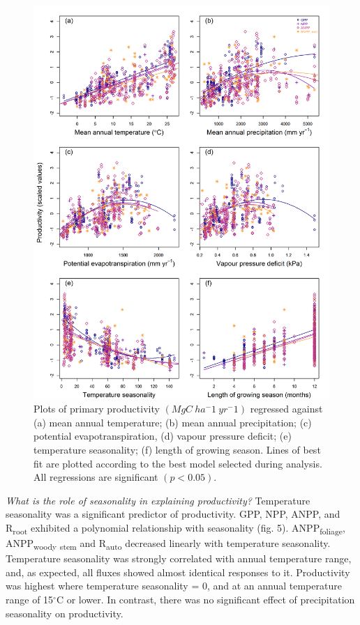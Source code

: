 \documentclass[]{article}
\begin{document}
\begin{figure}[H]
\includegraphics[width=1\linewidth]{combined_plots} \caption{Plots of primary productivity $(MgC~ha^-1~yr^-1)$ regressed against (a) mean annual temperature; (b) mean annual precipitation; (c) potential evapotranspiration, (d) vapour pressure deficit; (e) temperature seasonality; (f) length of growing season. Lines of best fit are plotted according to the best model selected during analysis. All regressions are significant $(p<0.05)$.}\label{fig:unnamed-chunk-9}
\end{figure}

\emph{What is the role of seasonality in explaining productivity?}
Temperature seasonality was a significant predictor of productivity.
GPP, NPP, ANPP, and R\textsubscript{root} exhibited a polynomial
relationship with seasonality (fig. 5). ANPP\textsubscript{foliage},
ANPP\textsubscript{woody} \textsubscript{stem} and R\textsubscript{auto}
decreased linearly with temperature seasonality. Temperature seasonality
was strongly correlated with annual temperature range, and, as expected,
all fluxes showed almost identical responses to it. Productivity was
highest where temperature seasonality = 0, and at an annual temperature
range of 15\(^\circ\)C or lower. In contrast, there was no significant
effect of precipitation seasonality on productivity.
\end{document}
